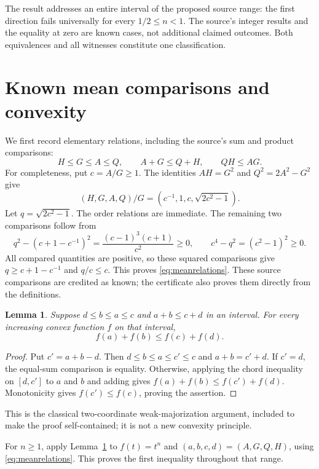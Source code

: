 \documentclass[11pt]{article}
\newtheorem{lemma}[theorem]{Lemma}
\begin{document}
The result addresses an entire interval of the proposed source range:
the first direction fails universally for every $1/2\leq n<1$.
The source's integer results and the equality at zero are known cases,
not additional claimed outcomes. Both equivalences and all witnesses
constitute one classification.

\section{Known mean comparisons and convexity}
We first record elementary relations, including the source's sum and
product comparisons:
\begin{equation}\label{eq:meanrelations}
 H\leq G\leq A\leq Q,\qquad A+G\leq Q+H,\qquad QH\leq AG.
\end{equation}
For completeness, put $c=A/G\geq1$. The identities
$AH=G^2$ and $Q^2=2A^2-G^2$ give
\begin{equation}\label{eq:normalize}
 (H,G,A,Q)/G=(c^{-1},1,c,\sqrt{2c^2-1}).
\end{equation}
Let $q=\sqrt{2c^2-1}$. The order relations are immediate. The remaining
two comparisons follow from
\[
 q^2-(c+1-c^{-1})^2=\frac{(c-1)^3(c+1)}{c^2}\geq0,
 \qquad c^4-q^2=(c^2-1)^2\geq0.
\]
All compared quantities are positive, so these squared comparisons
give $q\geq c+1-c^{-1}$ and $q/c\leq c$. This proves
\eqref{eq:meanrelations}. These source comparisons are credited as
known; the certificate also proves them directly from the definitions.

\begin{lemma}\label{lem:convex}
Suppose $d\leq b\leq a\leq c$ and $a+b\leq c+d$ in an interval.
For every increasing convex function $f$ on that interval,
\[
 f(a)+f(b)\leq f(c)+f(d).
\]
\end{lemma}
\begin{proof}
Put $c'=a+b-d$. Then $d\leq b\leq a\leq c'\leq c$ and
$a+b=c'+d$. If $c'=d$, the equal-sum comparison is equality.
Otherwise, applying the chord inequality on $[d,c']$ to $a$ and $b$
and adding gives $f(a)+f(b)\leq f(c')+f(d)$. Monotonicity gives
$f(c')\leq f(c)$, proving the assertion.
\end{proof}
This is the classical two-coordinate weak-majorization argument,
included to make the proof self-contained; it is not a new convexity
principle.

For $n\geq1$, apply Lemma~\ref{lem:convex} to $f(t)=t^n$ and
$(a,b,c,d)=(A,G,Q,H)$, using \eqref{eq:meanrelations}. This proves
the first inequality throughout that range.
\end{document}
